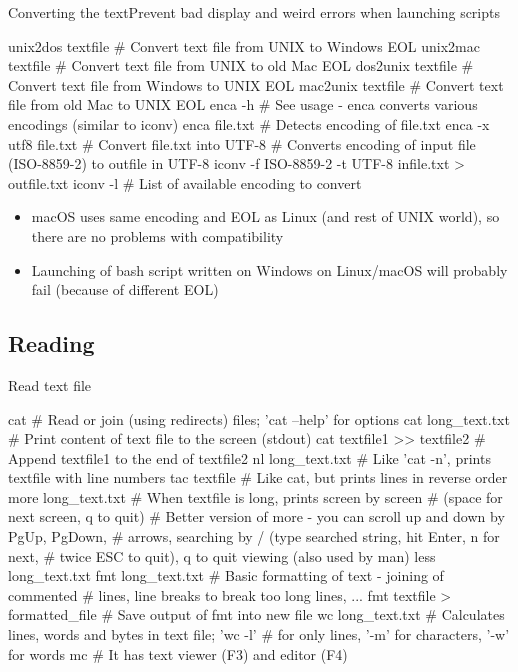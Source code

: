\documentclass[compress, xelatex, 11pt, xcolor=svgnames, aspectratio=169, url={hyphens, lowtilde}]{beamer}
\begin{document}
\begin{frame}[fragile]{Converting the text}{Prevent bad display and weird errors when launching scripts}
	\label{eolencoding}
	\begin{bashcode}
    unix2dos textfile # Convert text file from UNIX to Windows EOL
    unix2mac textfile # Convert text file from UNIX to old Mac EOL
    dos2unix textfile # Convert text file from Windows to UNIX EOL
    mac2unix textfile # Convert text file from old Mac to UNIX EOL
    enca -h # See usage - enca converts various encodings (similar to iconv)
    enca file.txt # Detects encoding of file.txt
    enca -x utf8 file.txt # Convert file.txt into UTF-8
    # Converts encoding of input file (ISO-8859-2) to outfile in UTF-8
    iconv -f ISO-8859-2 -t UTF-8 infile.txt > outfile.txt
    iconv -l # List of available encoding to convert
	\end{bashcode}
	\begin{itemize}
		\item macOS uses same encoding and EOL as Linux (and rest of UNIX world), so there are no problems with compatibility
		\item Launching of bash script written on Windows on Linux/macOS will probably fail (because of different EOL)
	\end{itemize}
\end{frame}

\subsection{Reading}

\begin{frame}[fragile]{Read text file}
	\begin{bashcode}
    cat # Read or join (using redirects) files; 'cat --help' for options
    cat long_text.txt # Print content of text file to the screen (stdout)
    cat textfile1 >> textfile2 # Append textfile1 to the end of textfile2
    nl long_text.txt # Like 'cat -n', prints textfile with line numbers
    tac textfile # Like cat, but prints lines in reverse order
    more long_text.txt # When textfile is long, prints screen by screen
                       # (space for next screen, q to quit)
    # Better version of more - you can scroll up and down by PgUp, PgDown,
    # arrows, searching by / (type searched string, hit Enter, n for next,
    # twice ESC to quit), q to quit viewing (also used by man)
    less long_text.txt
    fmt long_text.txt # Basic formatting of text - joining of commented
                      # lines, line breaks to break too long lines, ...
    fmt textfile > formatted_file # Save output of fmt into new file
    wc long_text.txt # Calculates lines, words and bytes in text file; 'wc -l'
                     # for only lines, '-m' for characters, '-w' for words
    mc # It has text viewer (F3) and editor (F4)
	\end{bashcode}
\end{frame}
\end{document}
